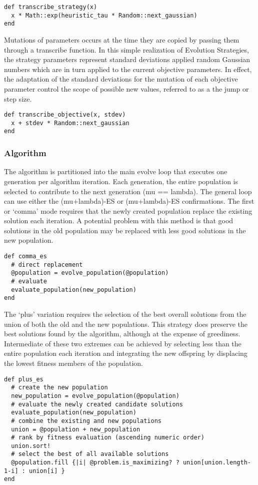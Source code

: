 \begin{lstlisting}
def transcribe_strategy(x)
  x * Math::exp(heuristic_tau * Random::next_gaussian) 
end
\end{lstlisting}

Mutations of parameters occurs at the time they are copied by passing them through a transcribe function. In this simple realization of Evolution Strategies, the strategy parameters represent standard deviations applied random Gaussian numbers which are in turn applied to the current objective parameters. In effect, the adaptation of the standard deviations for the mutation of each objective parameter control the scope of possible new values, referred to as a the jump or step size. 

\begin{lstlisting}
def transcribe_objective(x, stdev)
  x + stdev * Random::next_gaussian
end
\end{lstlisting}

\subsubsection{Algorithm}
The algorithm is partitioned into the main evolve loop that executes one generation per algorithm iteration. Each generation, the entire population is selected to contribute to the next generation (mu == lambda). The general loop can use either the (mu+lambda)-ES or (mu+lambda)-ES confirmations. The first or `comma' mode requires that the newly created population replace the existing solution each iteration. A potential problem with this method is that good solutions in the old population may be replaced with less good solutions in the new population. 

\begin{lstlisting}
def comma_es
  # direct replacement
  @population = evolve_population(@population)
  # evaluate
  evaluate_population(new_population)
end
\end{lstlisting}

The `plus' variation requires the selection of the best overall solutions from the union of both the old and the new populations. This strategy does preserve the best solutions found by the algorithm, although at the expense of greediness. Intermediate of these two extremes can be achieved by selecting less than the entire population each iteration and integrating the new offspring by displacing the lowest fitness members of the population.

\begin{lstlisting}
def plus_es
  # create the new population
  new_population = evolve_population(@population)
  # evaluate the newly created candidate solutions
  evaluate_population(new_population)
  # combine the existing and new populations
  union = @population + new_population
  # rank by fitness evaluation (ascending numeric order)
  union.sort!
  # select the best of all available solutions
  @population.fill {|i| @problem.is_maximizing? ? union[union.length-1-i] : union[i] }    
end
\end{lstlisting}

